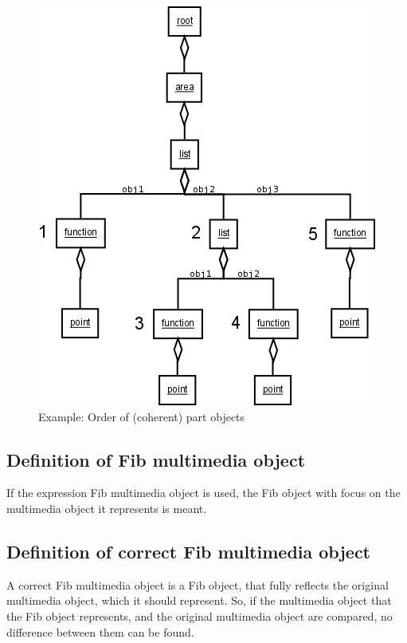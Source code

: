 \begin{figure}[htbp]
\begin{center}
  \includegraphics[scale=0.5]{order_partobjects}
\end{center}
\caption{Example: Order of (coherent) part objects}
\label{figOrderPartobjekts}
\end{figure}




\subsection{Definition of Fib multimedia object}

If the expression Fib multimedia object is used, the Fib object with focus on the multimedia object it represents is meant.


\subsection{Definition of correct Fib multimedia object}

A correct Fib multimedia object is a Fib object, that fully reflects the original multimedia object, which it should represent. So, if the multimedia object that the Fib object represents, and the original multimedia object are compared, no difference between them can be found.







